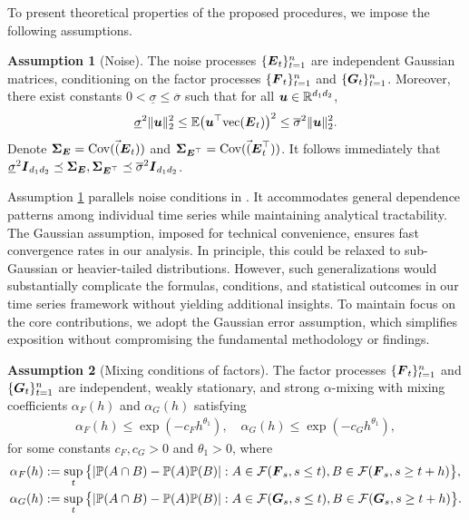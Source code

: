 \documentclass[11pt,letterpaper]{article}
\newcommand{\bfm}[1]{\ensuremath{\boldsymbol{#1}}} %
\def\bu{\bfm u}   \def\bU{\bfm U}  \def\UU{\mathbb{U}}
\DeclareMathOperator{\Cov}{Cov}
\theoremstyle{definition}
\newtheorem{assumption}{Assumption}
\begin{document}
To present theoretical properties of the proposed procedures, we impose the following assumptions.

\begin{assumption}[Noise]
\label{assum: error term}
The noise processes $\{\bE_t\}_{t=1}^n$ are independent Gaussian matrices, conditioning on the factor processes $\{\bF_t\}_{t=1}^n$ and $ \{\bG_t\}_{t=1}^n$. Moreover, there exist constants $0 < \underline{\sigma} \le \overline{\sigma}$ such that for all $\bu \in \RR^{d_1d_2}$,
\[
\underline{\sigma}^2 \| \bu \|_{2}^2 \le \EE\big( \bu^\top \text{vec}(\bE_t) \big)^2 \le \overline{\sigma}^2 \| \bu \|_{2}^2.
\]    
Denote $\bSigma_{\bE} = \Cov(\Vec(\bE_t))$ and $\bSigma_{\bE^{\top}} = \Cov(\Vec(\bE_t^{\top}))$. It follows immediately that $\underline{\sigma}^2 \bI_{d_1d_2} \preceq \bSigma_{\bE}, \bSigma_{\bE^{\top}} \preceq \overline{\sigma}^2 \bI_{d_1d_2}$.
\end{assumption}






Assumption \ref{assum: error term} parallels noise conditions in \cite{lam2011estimation,lam2012factor, han2024tensor, han2024cp, chen2022factor}. It accommodates general dependence patterns among individual time series while maintaining analytical tractability. The Gaussian assumption, imposed for technical convenience, ensures fast convergence rates in our analysis. In principle, this could be relaxed to sub-Gaussian or heavier-tailed distributions. However, such generalizations would substantially complicate the formulas, conditions, and statistical outcomes in our time series framework without yielding additional insights. To maintain focus on the core contributions, we adopt the Gaussian error assumption, which simplifies exposition without compromising the fundamental methodology or findings.



\begin{assumption}[Mixing conditions of factors]
\label{assum: alpha-mixing}
The factor processes $\{\bF_t\}_{t=1}^n$ and $\{\bG_t\}_{t=1}^n$ are independent, weakly stationary, and strong $\alpha$-mixing with mixing coefficients $\alpha_{ F}(h)$ and $\alpha_{ G}(h)$ satisfying
\begin{align*}
\alpha_{ F}(h) \le \exp\left({-c_{ F} h^{\theta_1}}\right), \quad \alpha_{ G}(h) \le \exp\left({-c_{ G} h^{\theta_1}}\right),    
\end{align*}
for some constants $c_{ F}, c_{ G} > 0 $ and $\theta_1 >0$, where
\begin{align*}
\alpha_{ F}(h) &:= \sup_t \big\{|\PP(A \cap B) - \PP(A)\PP(B)| : A \in \cF(\bF_s, s \le t), B \in \cF(\bF_s, s \geq t + h) \big\}, \\
\alpha_{ G}(h) &:= \sup_t \big\{ |\PP(A \cap B) - \PP(A)\PP(B)| : A \in \cF(\bG_s, s \le t), B \in \cF(\bG_s, s \geq t + h) \big\}.    
\end{align*}

\end{assumption}
\end{document}
